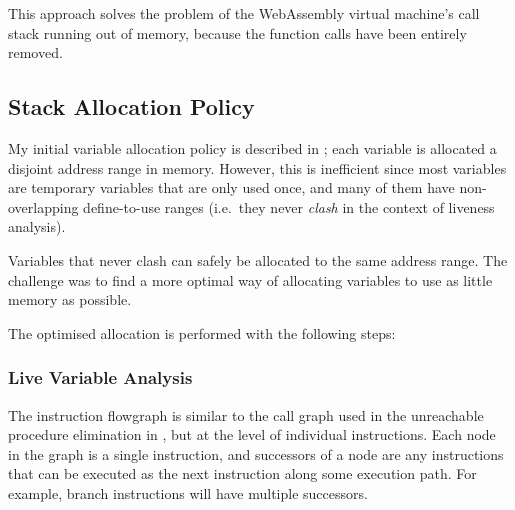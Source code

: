 \documentclass[00-main.tex]{subfiles}
\begin{document}
This approach solves the problem of the WebAssembly virtual machine's call stack running out of memory, because the function calls have been entirely removed.

\FloatBarrier

\subsection{Stack Allocation Policy}\label{sec:impl:optimised stack allocation}

My initial variable allocation policy is described in ; each variable is allocated a disjoint address range in memory.
However, this is inefficient since most variables are temporary variables that are only used once, and many of them have non-overlapping define-to-use ranges (i.e.\ they never \emph{clash} in the context of liveness analysis).

Variables that never clash can safely be allocated to the same address range.
The challenge was to find a more optimal way of allocating variables to use as little memory as possible.

The optimised allocation is performed with the following steps:


\subsubsection{Live Variable Analysis}

\newcommand{\lvadef}{\ensuremath{\mathit{def}}}
\newcommand{\lvaref}{\ensuremath{\mathit{ref}}}

The instruction flowgraph is similar to the call graph used in the unreachable procedure elimination in , but at the level of individual instructions.
Each node in the graph is a single instruction, and successors of a node are any instructions that can be executed as the next instruction along some execution path.
For example, branch instructions will have multiple successors.
\end{document}
